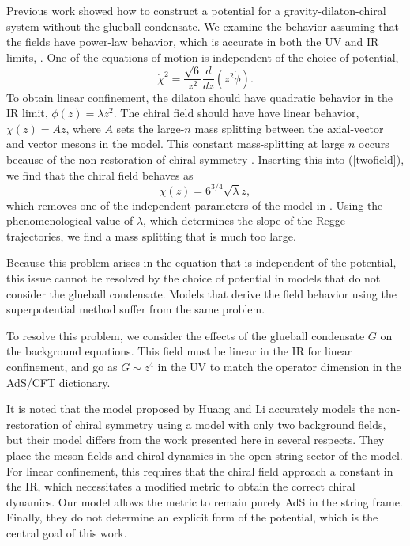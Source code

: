 \documentclass[aps,prd,12pt,nofootinbib]{revtex4}
\newcommand{\be}{\begin{equation}}
\newcommand{\ee}{\end{equation}}
\def\Dz{\frac{d}{dz}}
\def\phidot{\dot{\phi}}
\def\chidot{\dot{\chi}}
\def\rt6{\sqrt{6}}
\begin{document}
Previous work showed how to construct a potential for a gravity-dilaton-chiral system without the glueball condensate. 
We examine the behavior assuming that the fields have power-law behavior, which is accurate in both the UV and IR limits, \cite{Springer2010}. 
One of the equations of motion is independent of the choice of potential,
\be
\chidot^2  = \frac{\rt6}{z^2} \Dz(z^2\phidot). 
\label{twofield}
\ee
To obtain linear confinement, the dilaton should have quadratic behavior in the IR limit, $\phi(z)=\lambda z^2$.
The chiral field should have have linear behavior, $\chi(z)=A z$, where $A$ sets the large-$n$ mass splitting between the axial-vector and vector mesons in the model. 
This constant mass-splitting at large $n$ occurs because of the non-restoration of chiral symmetry \cite{Shifman-2008}.
Inserting this into (\ref{twofield}), we find that the chiral field behaves as
\be
\chi(z)=6^{3/4}\sqrt{\lambda}z,
\ee
which removes one of the independent parameters of the model in \cite{gherghetta-kelley}. 
Using the phenomenological value of $\lambda$, which determines the slope of the Regge trajectories, we find a mass splitting that is much too large.

Because this problem arises in the equation that is independent of the potential, this issue cannot be resolved by the choice of potential in models that do not consider the glueball condensate. 
Models that derive the field behavior using the superpotential method suffer from the same problem.

To resolve this problem, we consider the effects of the glueball condensate $G$ on the background equations. 
This field must be linear in the IR for linear confinement, and go as $G \sim z^4$ in the UV to match the operator dimension in the AdS/CFT dictionary.

It is noted that the model proposed by Huang and Li \cite{Li2013, Li2013a} accurately models the non-restoration of chiral symmetry using a model with only two background fields, but their model differs from the work presented here in several respects.
They place the meson fields and chiral dynamics in the open-string sector of the model. 
For linear confinement, this requires that the chiral field approach a constant in the IR, which necessitates a modified metric to obtain the correct chiral dynamics.
Our model allows the metric to remain purely AdS in the string frame.
Finally, they do not determine an explicit form of the potential, which is the central goal of this work.

\end{document}
